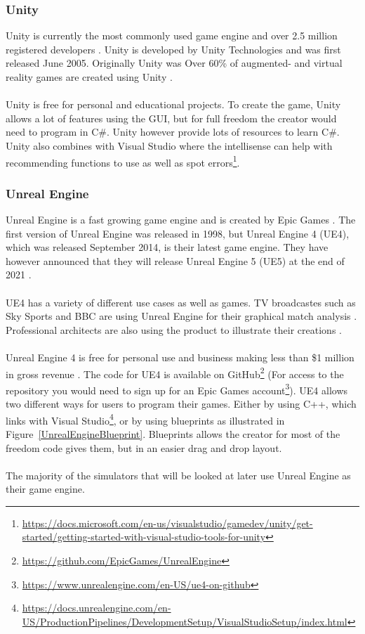 \subsubsection{Unity}
Unity is currently the most commonly used game engine and over 2.5 million registered developers \cite{Unity_arnia_software}. Unity is developed by Unity Technologies and was first released June 2005.  Originally Unity was Over 60\% of augmented- and virtual reality games are created using Unity  \cite{GameEngine_UnityGame_book}. 
\\~\\
Unity is free for personal and educational projects. To create the game, Unity allows a lot of features using the GUI, but for full freedom the creator would need to program in C\#. Unity however provide lots of resources to learn C\#. Unity also combines with Visual Studio where the intellisense can help with recommending functions to use as well as spot errors\footnote{\url{https://docs.microsoft.com/en-us/visualstudio/gamedev/unity/get-started/getting-started-with-visual-studio-tools-for-unity}}.

\subsubsection{Unreal Engine}
Unreal Engine is a fast growing game engine and is created by Epic Games \cite{UnrealEngine_Book}. The first version of Unreal Engine was released in 1998, but Unreal Engine 4 (UE4), which was released September 2014, is their latest game engine. They have however announced that they will release Unreal Engine 5 (UE5) at the end of 2021 \cite{UE5}. 
\\~\\
UE4 has a variety of different use cases as well as games. TV broadcastes such as Sky Sports and BBC are using Unreal Engine for their graphical match analysis \cite{UnrealEngine_LiveBroadcast}. Professional architects are also using the product to illustrate their creations \cite{UnrealEngine_Automative}.   
\\~\\
Unreal Engine 4 is free for personal use and business making less than \$1 million in gross revenue \cite{UE5}. The code for UE4 is available on GitHub\footnote{\url{https://github.com/EpicGames/UnrealEngine}} (For access to the repository you would need to sign up for an Epic Games account\footnote{\url{https://www.unrealengine.com/en-US/ue4-on-github}}). UE4 allows two different ways for users to program their games. Either by using C++, which links with Visual Studio\footnote{\url{https://docs.unrealengine.com/en-US/ProductionPipelines/DevelopmentSetup/VisualStudioSetup/index.html}}, or by using blueprints as illustrated in Figure~\ref{UnrealEngineBlueprint}. Blueprints allows the creator for most of the freedom code gives them, but in an easier drag and drop layout.
\\~\\
The majority of the simulators that will be looked at later use Unreal Engine as their game engine. 

